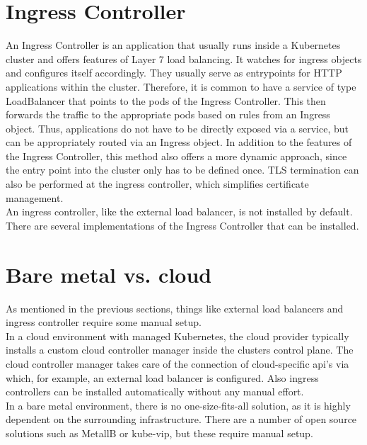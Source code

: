 \section{Ingress Controller}

An Ingress Controller is an application that usually runs inside a Kubernetes cluster and offers features of Layer 7 load balancing.
It watches for ingress objects and configures itself accordingly.
They usually serve as entrypoints for HTTP applications within the cluster.
Therefore, it is common to have a service of type LoadBalancer that points to the pods of the Ingress Controller.
This then forwards the traffic to the appropriate pods based on rules from an Ingress object.
Thus, applications do not have to be directly exposed via a service, but can be appropriately routed via an Ingress object.
In addition to the features of the Ingress Controller, this method also offers a more dynamic approach, since the entry point into the cluster only has to be defined once.
TLS termination can also be performed at the ingress controller, which simplifies certificate management.
\\
An ingress controller, like the external load balancer, is not installed by default.
There are several implementations of the Ingress Controller that can be installed.

\section{Bare metal vs. cloud}

As mentioned in the previous sections, things like external load balancers and ingress controller require some manual setup.
\\
In a cloud environment with managed Kubernetes, the cloud provider typically installs a custom cloud controller manager inside the clusters control plane.
The cloud controller manager takes care of the connection of cloud-specific api's via which, for example, an external load balancer is configured.
Also ingress controllers can be installed automatically without any manual effort.
\\
In a bare metal environment, there is no one-size-fits-all solution, as it is highly dependent on the surrounding infrastructure.
There are a number of open source solutions such as MetallB or kube-vip, but these require manual setup.
